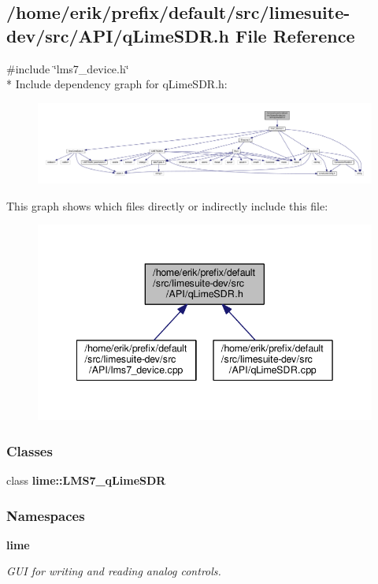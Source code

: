 \subsection{/home/erik/prefix/default/src/limesuite-\/dev/src/\+A\+P\+I/q\+Lime\+S\+DR.h File Reference}
\label{qLimeSDR_8h}
{\ttfamily \#include \char`\"{}lms7\+\_\+device.\+h\char`\"{}}\\*
Include dependency graph for q\+Lime\+S\+D\+R.\+h\+:
\nopagebreak
\begin{figure}[H]
\begin{center}
\leavevmode
\includegraphics[width=350pt]{d0/df8/qLimeSDR_8h__incl}
\end{center}
\end{figure}
This graph shows which files directly or indirectly include this file\+:
\nopagebreak
\begin{figure}[H]
\begin{center}
\leavevmode
\includegraphics[width=342pt]{d4/df7/qLimeSDR_8h__dep__incl}
\end{center}
\end{figure}
\subsubsection*{Classes}
\begin{DoxyCompactItemize}
\item 
class {\bf lime\+::\+L\+M\+S7\+\_\+q\+Lime\+S\+DR}
\end{DoxyCompactItemize}
\subsubsection*{Namespaces}
\begin{DoxyCompactItemize}
\item 
 {\bf lime}
\begin{DoxyCompactList}\small\item\em G\+UI for writing and reading analog controls. \end{DoxyCompactList}\end{DoxyCompactItemize}
